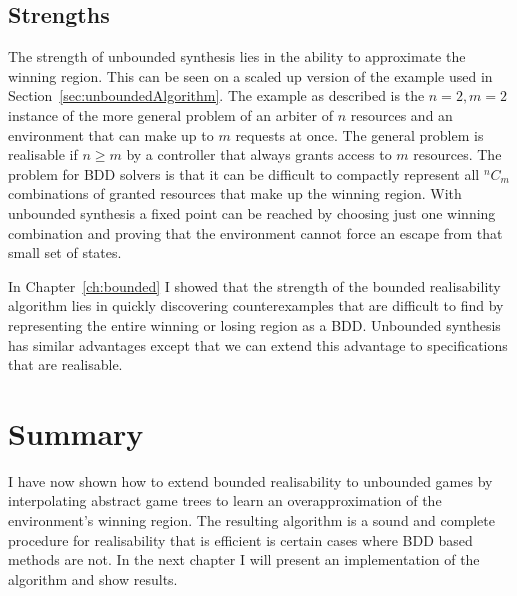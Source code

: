 \subsection{Strengths}

The strength of unbounded synthesis lies in the ability to approximate the winning region. This can be seen on a scaled up version of the example used in Section~\ref{sec:unboundedAlgorithm}.  The example as described is the $n=2, m=2$ instance of the more general problem of an arbiter of $n$ resources and an environment that can make up to $m$ requests at once. The general problem is realisable if $n \geq m$ by a controller that always grants access to $m$ resources.  The problem for BDD solvers is that it can be difficult to compactly represent all $^n C_m$ combinations of granted resources that make up the winning region. With unbounded synthesis a fixed point can be reached by choosing just one winning combination and proving that the environment cannot force an escape from that small set of states.



In Chapter~\ref{ch:bounded} I showed that the strength of the bounded realisability algorithm lies in quickly discovering counterexamples that are difficult to find by representing the entire winning or losing region as a BDD. Unbounded synthesis has similar advantages except that we can extend this advantage to specifications that are realisable.

\section{Summary}

I have now shown how to extend bounded realisability to unbounded games by interpolating abstract game trees to learn an overapproximation of the environment's winning region. The resulting algorithm is a sound and complete procedure for realisability that is efficient is certain cases where BDD based methods are not. In the next chapter I will present an implementation of the algorithm and show results.

